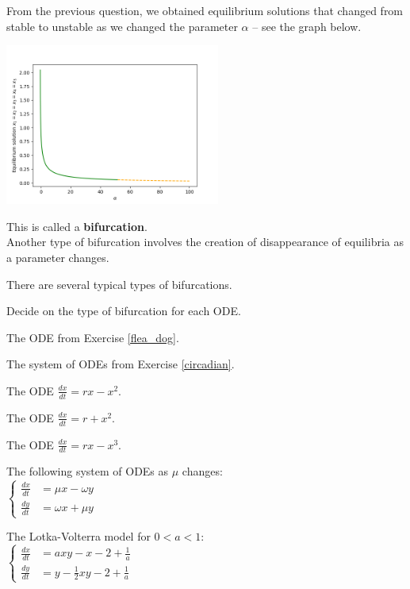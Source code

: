 \documentclass{workbook}
\begin{document}
\begin{slide}
\question

From the previous question, we obtained equilibrium solutions that changed from stable to unstable as we changed the parameter $\alpha$ -- see the graph below.
	\begin{center}
		\includegraphics[width=200pt]{images/circadian5.png}
	\end{center}

This is called a \textbf{bifurcation}. \\


Another type of bifurcation involves the creation of disappearance of equilibria as a parameter changes.

There are several typical types of bifurcations.

\end{slide}


\begin{slide}


Decide on the type of bifurcation for each ODE.

\begin{parts}
	\item The ODE from Exercise \ref{flea_dog}.
	\item The system of ODEs from Exercise \ref{circadian}.
	\item The ODE $\frac{dx}{dt} = rx - x^2$.
	\item The ODE $\frac{dx}{dt} = r + x^2$.
	\item The ODE $\frac{dx}{dt} = rx - x^3$.
	\item The following system of ODEs as $\mu$ changes: \\
	$ \begin{cases}
 		\frac{dx}{dt} & = \mu x -  \omega y \\[5pt]
 		\frac{dy}{dt} & = \omega x + \mu y
	\end{cases}
	$
	\item The Lotka-Volterra model for $0< a < 1$: \\
	$ \begin{cases}
 		\frac{dx}{dt} & = a xy - x - 2 + \frac1a\\[5pt]
 		\frac{dy}{dt} & = y - \frac12 xy - 2 + \frac1a
	\end{cases}
	$
\end{parts}
	
	
\end{slide}
\end{document}

